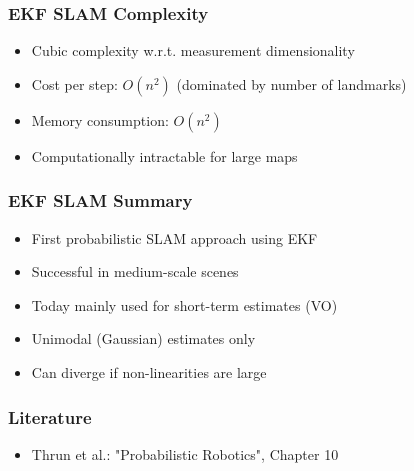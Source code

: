\begin{frame}
    \frametitle{EKF SLAM Complexity}

    \begin{itemize}
    \item Cubic complexity w.r.t. measurement dimensionality
    \item Cost per step: $O(n^2)$ (dominated by number of landmarks)
    \item Memory consumption: $O(n^2)$
    \item Computationally intractable for large maps
    \end{itemize}
\end{frame}

\begin{frame}
    \frametitle{EKF SLAM Summary}

    \begin{itemize}
    \item First probabilistic SLAM approach using EKF
    \item Successful in medium-scale scenes
    \item Today mainly used for short-term estimates (VO)
    \item Unimodal (Gaussian) estimates only
    \item Can diverge if non-linearities are large
    \end{itemize}
\end{frame}

\begin{frame}
    \frametitle{Literature}

    \begin{itemize}
    \item Thrun et al.: "Probabilistic Robotics", Chapter 10
    \end{itemize}
\end{frame}